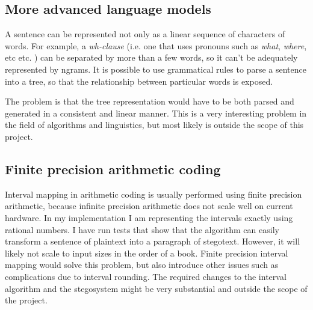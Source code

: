 \documentclass[12pt,twoside,a4paper]{article}
\makeatletter
\newcommand*{\ie}{i.e.\@\xspace}
\newcommand*{\etc}{%
    \@ifnextchar{.}%
        {etc}%
        {etc.\@\xspace}%
}
\makeatother
\begin{document}
\subsection{More advanced language models}

A sentence can be represented not only as a linear sequence of characters of words. For example, a \emph{wh-clause} (\ie one that uses pronouns such as \emph{what}, \emph{where}, \etc) can be separated by more than a few words, so it can't be adequately represented by ngrams. It is possible to use grammatical rules to parse a sentence into a tree, so that the relationship between particular words is exposed.

The problem is that the tree representation would have to be both parsed and generated in a consistent and linear manner. This is a very interesting problem in the field of algorithms and linguistics, but most likely is outside the scope of this project.

\subsection{Finite precision arithmetic coding}

Interval mapping in arithmetic coding is usually performed using finite precision arithmetic, because infinite precision arithmetic does not scale well on current hardware. In my implementation I am representing the intervals exactly using rational numbers. I have run tests that show that the algorithm can easily transform a sentence of plaintext into a paragraph of stegotext. However, it will likely not scale to input sizes in the order of a book. Finite precision interval mapping would solve this problem, but also introduce other issues such as complications due to interval rounding. The required changes to the interval algorithm and the stegosystem might be very substantial and outside the scope of the project.

\footnotesize


\end{document}
